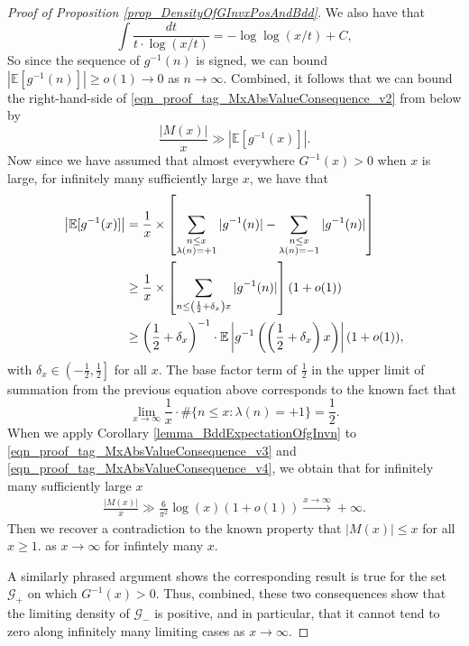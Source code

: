\documentclass[11pt,reqno,a4letter]{article}
\numberwithin{figure}{section}
\numberwithin{table}{section}
\theoremstyle{plain}
\numberwithin{theorem}{section}
\theoremstyle{definition}
\begin{document}
\begin{proof}[Proof of Proposition \ref{prop_DensityOfGInvxPosAndBdd}]
We also have that  
\[
\int \frac{dt}{t \cdot \log(x/t)} = -\log\log(x/t) + C, 
\]
So since the sequence of $g^{-1}(n)$ is signed, we can bound 
$|\mathbb{E}[g^{-1}(n)]| \geq o(1) \rightarrow 0$ as $n \rightarrow \infty$. 
Combined, it follows that we can bound the right-hand-side of 
\eqref{eqn_proof_tag_MxAbsValueConsequence_v2} from below by 
\begin{equation} 
\label{eqn_proof_tag_MxAbsValueConsequence_v3} 
\frac{|M(x)|}{x} \gg \left\lvert \mathbb{E}[g^{-1}(x)] \right\rvert. 
\end{equation} 
Now since we have assumed that almost everywhere $G^{-1}(x) > 0$ when $x$ is large, 
for infinitely many sufficiently large $x$, we have that 
\begin{align} 
\notag 
\left\lvert \mathbb{E}[g^{-1}(x)] \right\rvert & = \frac{1}{x} \times \left[ 
     \sum_{\substack{n \leq x \\ \lambda(n) = +1}} |g^{-1}(n)| - 
     \sum_{\substack{n \leq x \\ \lambda(n) = -1}} |g^{-1}(n)| \right] \\ 
\notag 
     & \geq \frac{1}{x} \times \left[\sum_{n \leq \left(\frac{1}{2} + \delta_x\right) x} |g^{-1}(n)|\right] (1 + o(1)) \\ 
\label{eqn_proof_tag_MxAbsValueConsequence_v4} 
     & \geq \left(\frac{1}{2} + \delta_x\right)^{-1} \cdot 
     \mathbb{E}\left\lvert g^{-1}\left(\left(\frac{1}{2} + \delta_x\right) x\right) \right\rvert (1 + o(1)), 
\end{align} 
with $\delta_x \in \left(-\frac{1}{2}, \frac{1}{2}\right]$ for all $x$. 
The base factor term of $\frac{1}{2}$ in the upper limit of summation from the previous equation 
above corresponds to the known fact that 
\[
\lim_{x \rightarrow \infty} \frac{1}{x} \cdot \#\{n \leq x: \lambda(n) = +1\} = \frac{1}{2}. 
\]
When we apply Corollary \ref{lemma_BddExpectationOfgInvn} to 
\eqref{eqn_proof_tag_MxAbsValueConsequence_v3} and 
\eqref{eqn_proof_tag_MxAbsValueConsequence_v4}, we obtain that for infinitely many 
sufficiently large $x$ 
\begin{align*} 
\frac{|M(x)|}{x} \gg \frac{6}{\pi^2} \log\left(x\right) (1 + o(1)) 
     \xrightarrow{x \rightarrow \infty} + \infty. 
\end{align*} 
Then we recover a contradiction to the known property that $|M(x)| \leq x$ 
for all $x \geq 1$. 
as $x \rightarrow \infty$ for 
infintely many $x$. 

A similarly phrased argument shows the corresponding result is true for the set $\mathcal{G}_{+}$ on which 
$G^{-1}(x) > 0$. 
Thus, combined, these two consequences show that the limiting density of $\mathcal{G}_{-}$ is positive, 
and in particular, that it cannot tend to zero along infinitely many limiting cases 
as $x \rightarrow \infty$. 
\end{proof} 
\end{document}

